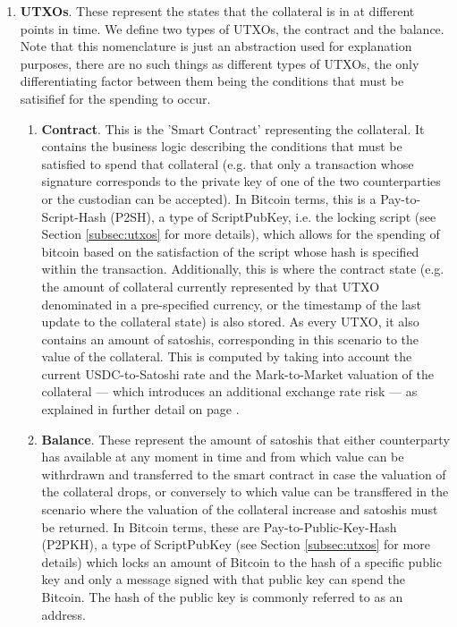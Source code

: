 \begin{enumerate}
    \item \textbf{UTXOs}. These represent the states that the collateral is in at different points in time. We define two types of UTXOs, the contract and the balance. Note that this nomenclature is just an abstraction used for explanation purposes, there are no such things as different types of UTXOs, the only differentiating factor between them being the conditions that must be satisifief for the spending to occur.
    \begin{enumerate}
        \item \textbf{Contract}. This is the 'Smart Contract' representing the collateral. It contains the business logic describing the conditions that must be satisfied to spend that collateral (e.g. that only a transaction whose signature corresponds to the private key of one of the two counterparties or the custodian can be accepted). In Bitcoin terms, this is a Pay-to-Script-Hash (P2SH), a type of ScriptPubKey, i.e. the locking script (see Section \ref{subsec:utxos} for more details), which allows for the spending of bitcoin based on the satisfaction of the script whose hash is specified within the transaction. Additionally, this is where the contract state (e.g. the amount of collateral currently represented by that UTXO denominated in a pre-specified currency, or the timestamp of the last update to the collateral state) is also stored. As every UTXO, it also contains an amount of satoshis, corresponding in this scenario to the value of the collateral. This is computed by taking into account the current USDC-to-Satoshi rate and the Mark-to-Market valuation of the collateral --- which introduces an additional exchange rate risk --- as explained in further detail on page \pageref{item:valuation}.
        
        \item \textbf{Balance}. These represent the amount of satoshis that either counterparty has available at any moment in time and from which value can be withrdrawn and transferred to the smart contract in case the valuation of the collateral drops, or conversely to which value can be transffered in the scenario where the valuation of the collateral increase and satoshis must be returned. In Bitcoin terms, these are Pay-to-Public-Key-Hash (P2PKH), a type of ScriptPubKey (see Section \ref{subsec:utxos} for more details) which locks an amount of Bitcoin to the hash of a specific public key and only a message signed with that public key can spend the Bitcoin. The hash of the public key is commonly referred to as an address.
    \end{enumerate}
\end{enumerate}


